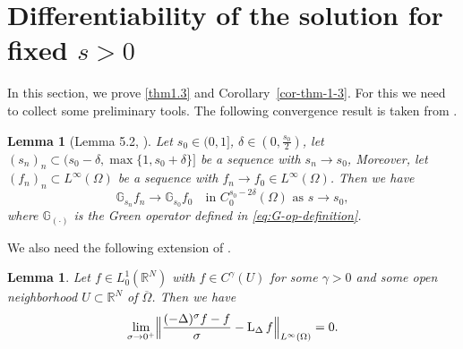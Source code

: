 \documentclass[notitlepage,11pt,reqno]{amsart}
\newtheorem{lemma}[theorem]{Lemma}
\theoremstyle{definition}
\numberwithin{equation}{section}
\newcommand{\cGs}{{\mathbb G}}
\newcommand{\R}{\mathds{R}}
\DeclareMathOperator{\loglap}{L_{\Delta}}
\begin{document}
\section{Differentiability of the solution for fixed \texorpdfstring{$s>0$}{s>0}}\label{diff for any s}
In this section, we prove \cref{thm1.3} and Corollary~\ref{cor-thm-1-3}. For this we need to collect some preliminary tools.
The following convergence result is taken from \cite{JSW20}.
\begin{lemma}[Lemma 5.2, \cite{JSW20}]\label{lemma:continuity-smooth}
Let $s_0 \in (0,1]$, $\delta\in(0,\frac{s_0}{2})$, let $(s_n)_n\subset (s_0-\delta,\max\{1,s_0+\delta\}]$ be a sequence with $s_n \to s_0$, 
Moreover, let $(f_n)_n \subset L^\infty(\Omega)$ be a sequence with $f_n \to f_0 \in L^\infty(\Omega)$. Then we have
\[
\cGs_{s_n} f_n \to \cGs_{s_0} f_0 \quad\text{in $C^{s_0-2\delta}_0(\Omega)$ as $s\to s_0,$}
\]
where $\cGs_{(\cdot)}$ is the Green operator defined in \eqref{eq:G-op-definition}.
\end{lemma}



We also need the following extension of \cite[Theorem 1.1]{CW19}.  

\begin{lemma}
  \label{extension-CW-19}
Let $f \in L^1_0(\R^N)$ with $f \in C^\gamma(U)$ for some $\gamma>0$ and some open neighborhood $U \subset \R^N$ of $\overline{\Omega}$. Then we have 
  \begin{equation}
    \label{diff-f-L-1-0}
  \lim_{\sigma \to 0^+} \Bigl\|\frac{(-\Delta)^\sigma f-f}{\sigma}-\loglap f \Bigr\|_{L^\infty(\Omega)} = 0.
  \end{equation}
\end{lemma}
\end{document}
